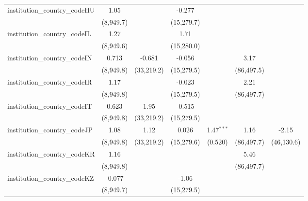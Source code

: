 \begin{tabular}{lcccccc}
   institution\_country\_codeHU          & 1.05          &               & -0.277        &               &              &   \\   
                                         & (8,949.7)     &               & (15,279.7)    &               &              &   \\   
   institution\_country\_codeIL          & 1.27          &               & 1.71          &               &              &   \\   
                                         & (8,949.6)     &               & (15,280.0)    &               &              &   \\   
   institution\_country\_codeIN          & 0.713         & -0.681        & -0.056        &               & 3.17         &   \\   
                                         & (8,949.8)     & (33,219.2)    & (15,279.5)    &               & (86,497.5)   &   \\   
   institution\_country\_codeIR          & 1.17          &               & -0.023        &               & 2.21         &   \\   
                                         & (8,949.8)     &               & (15,279.5)    &               & (86,497.7)   &   \\   
   institution\_country\_codeIT          & 0.623         & 1.95          & -0.515        &               &              &   \\   
                                         & (8,949.8)     & (33,219.2)    & (15,279.5)    &               &              &   \\   
   institution\_country\_codeJP          & 1.08          & 1.12          & 0.026         & 1.47$^{***}$  & 1.16         & -2.15\\   
                                         & (8,949.8)     & (33,219.2)    & (15,279.6)    & (0.520)       & (86,497.7)   & (46,130.6)\\   
   institution\_country\_codeKR          & 1.16          &               &               &               & 5.46         &   \\   
                                         & (8,949.8)     &               &               &               & (86,497.7)   &   \\   
   institution\_country\_codeKZ          & -0.077        &               & -1.06         &               &              &   \\   
                                         & (8,949.7)     &               & (15,279.5)    &               &              &   \\   

\end{tabular}
